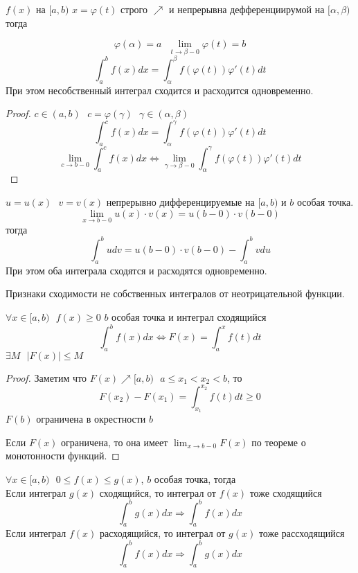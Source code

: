 \begin{theorem}
  $f(x)$ на $[a,b)$ $x = \varphi(t)$ строго $\nearrow$ и непрерывна
  дефференциирумой на $[\alpha, \beta)$ тогда

  $$
  \varphi(\alpha) = a ~~~ \lim_{t \to \beta - 0} \varphi(t) = b
  $$
  \[
    \int^{b}_{a} f(x)dx = \int^{\beta}_{\alpha} f(\varphi(t)) \varphi'(t)dt
  \]
  При этом несобственный интеграл сходится и расходится одновременно.
\end{theorem}

\begin{proof}
  $c \in (a, b) ~~~ c = \varphi(\gamma) ~~~ \gamma \in (\alpha, \beta)$
  \[
    \int^{c}_{a} f(x)dx = \int^{\gamma}_{\alpha} f(\varphi(t)) \varphi'(t)dt
  \]
  \[
    \lim_{c \to b - 0} \int^{c}_{a} f(x)dx \Leftrightarrow
    \lim_{\gamma \to \beta - 0} \int^{\gamma}_{\alpha} f(\varphi(t))
    \varphi'(t)dt
  \]
\end{proof}

\begin{theorem}
  $u = u(x) ~~~ v = v(x)$ непрерывно дифференцируемые на $[a, b)$ и
  $b$ особая точка.
  \[
    \lim_{x \to b - 0} u(x) \cdot v(x) = u(b - 0) \cdot v(b - 0)
  \]
  тогда
  \[
    \int^{b}_{a} udv = u(b - 0) \cdot v(b - 0) - \int^{b}_{a} vdu
  \]
  При этом оба интеграла сходятся и расходятся одновременно.
\end{theorem}

\begin{title}[\Large]
  Признаки сходимости не собственных интегралов от неотрицательной функции.
\end{title}

\begin{theorem}
  $\forall x \in [a, b) ~~~ f(x) \ge 0$ $b$ особая точка и интеграл
  сходящийся
  \[
    \int^{b}_{a} f(x)dx \Leftrightarrow F(x) = \int^{x}_{a} f(t)dt
  \]
  $\exists M ~~~ |F(x)| \le M$
\end{theorem}

\begin{proof}
  Заметим что $F(x) \nearrow [a, b) ~~~ a \le x_1 < x_2 < b$, то
  \[
    F(x_2) - F(x_1) = \int^{x_2}_{x_1} f(t)dt \ge 0
  \]
  $F(b)$ ограничена в окрестности $b$

  Если $F(x)$ ограничена, то она имеет $\lim_{x \to b -0} F(x)$ по теореме о
  монотонности функций.
\end{proof}

\begin{block}
  $\forall x \in [a, b) ~~~ 0 \le f(x) \le g(x)$, $b$ особая точка,
  тогда\\
   Если интеграл $g(x)$ сходящийся, то интеграл от $f(x)$ тоже сходящийся
  \[\int^{b}_{a} g(x)dx \Rightarrow \int^{b}_{a} f(x)dx\]
   Если интеграл $f(x)$ расходящийся, то интеграл от $g(x)$ тоже
  рассходящийся
  \[\int^{b}_{a} f(x)dx \Rightarrow \int^{b}_{a} g(x)dx\]
\end{block}

